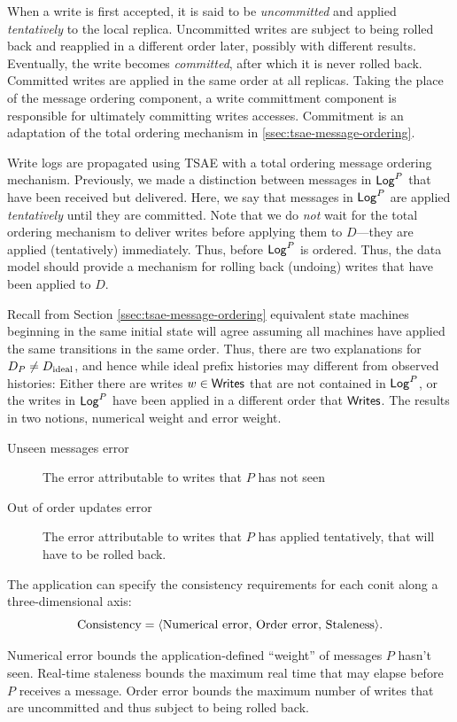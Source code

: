 \documentclass[]             %
{NASA}                       %
\theoremstyle{definition}
\begin{document}
When a write is first accepted, it is said to be \emph{uncommitted}
and applied \emph{tentatively} to the local replica. Uncommitted
writes are subject to being rolled back and reapplied in a different
order later, possibly with different results. Eventually, the write
becomes \emph{committed}, after which it is never rolled
back. Committed writes are applied in the same order at all
replicas. Taking the place of the message ordering component, a write
committment component is responsible for ultimately committing writes
accesses. Commitment is an adaptation of the total ordering mechanism
in \ref{ssec:tsae-message-ordering}.

Write logs are propagated using TSAE with a total ordering message
ordering mechanism. Previously, we made a distinction between messages
in $\mathsf{Log}^{P}$ that have been received but delivered. Here, we say that
messages in $\mathsf{Log}^{P}$ are applied \emph{tentatively} until they are
committed. Note that we do \emph{not} wait for the total ordering
mechanism to deliver writes before applying them to $D$---they are
applied (tentatively) immediately. Thus, before $\mathsf{Log}^{P}$ is
ordered. Thus, the data model should provide a mechanism for rolling
back (undoing) writes that have been applied to $D$.


Recall from Section \ref{ssec:tsae-message-ordering} equivalent state
machines beginning in the same initial state will agree assuming all
machines have applied the same transitions in the same order. Thus,
there are two explanations for $D_P \neq D_{\textrm{ideal}}$, and hence while
ideal prefix histories may different from observed histories: Either
there are writes $w \in \mathbf{\mathsf{Writes}}$ that are not contained in $\mathsf{Log}^{P}$,
or the writes in $\mathsf{Log}^{P}$ have been applied in a different order that
$\mathbf{\mathsf{Writes}}$. The results in two notions, numerical weight and error
weight.
\begin{description}
\item[Unseen messages error] The error attributable to writes that $P$
  has not seen
\item[Out of order updates error] The error attributable to writes
  that $P$ has applied tentatively, that will have to be rolled back.
\end{description}

The application can specify the consistency requirements for each
conit along a three-dimensional axis:
\[\textrm{Consistency} = \langle \textrm{Numerical error,
    \textrm{Order error}, \textrm{Staleness}} \rangle.\]

Numerical error bounds the application-defined ``weight'' of messages
$P$ hasn't seen. Real-time staleness bounds the maximum real time that
may elapse before $P$ receives a message. Order error bounds the
maximum number of writes that are uncommitted and thus subject to
being rolled back.
\end{document}
